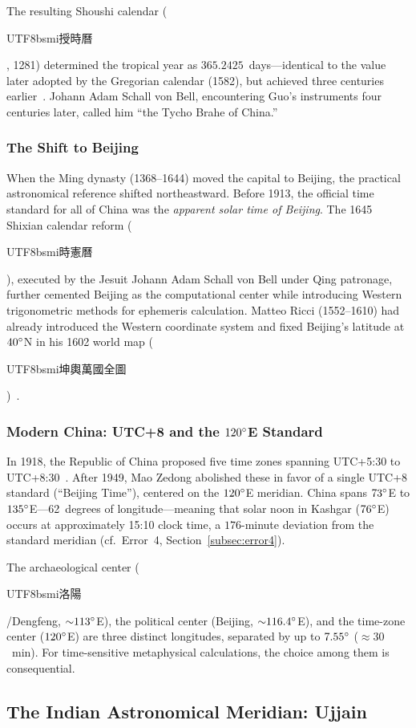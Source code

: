 \documentclass[10pt,a4paper]{article}
\newcommand{\zh}[1]{\begin{CJK}{UTF8}{bsmi}#1\end{CJK}}
\begin{document}
The resulting Shoushi calendar (\zh{授時曆}, 1281) determined the tropical
year as $365.2425$~days---identical to the value later adopted by the
Gregorian calendar (1582), but achieved three centuries
earlier~\cite{sivin2009}. Johann Adam Schall von Bell, encountering Guo's
instruments four centuries later, called him ``the Tycho Brahe of China.''

\subsubsection{The Shift to Beijing}

When the Ming dynasty (1368--1644) moved the capital to Beijing, the
practical astronomical reference shifted northeastward. Before 1913,
the official time standard for all of China was the \emph{apparent solar
time of Beijing}. The 1645 Shixian calendar reform (\zh{時憲曆}),
executed by the Jesuit Johann Adam Schall von Bell under Qing patronage,
further cemented Beijing as the computational center while introducing
Western trigonometric methods for ephemeris calculation. Matteo Ricci
(1552--1610) had already introduced the Western coordinate system and
fixed Beijing's latitude at $40\degree$N in his 1602 world map
(\zh{坤輿萬國全圖})~\cite{udias1994}.

\subsubsection{Modern China: UTC+8 and the $120\degree$E Standard}

In 1918, the Republic of China proposed five time zones spanning
UTC+5:30 to UTC+8:30~\cite{china_timezones_1918}. After 1949, Mao Zedong
abolished these in favor of a single UTC+8 standard (``Beijing
Time''), centered on the $120\degree$E meridian. China spans $73\degree$E to $135\degree$E---62~degrees of
longitude---meaning that solar noon in Kashgar ($76\degree$E) occurs at
approximately 15:10 clock time, a $176$-minute deviation from the standard
meridian (cf.~Error~4, Section~\ref{subsec:error4}).

The archaeological center (\zh{洛陽}/Dengfeng, ${\sim}113\degree$E), the
political center (Beijing, ${\sim}116.4\degree$E), and the time-zone center
($120\degree$E) are three distinct longitudes, separated by up to $7.55\degree$
($\approx 30$~min). For time-sensitive metaphysical calculations, the choice
among them is consequential.

\subsection{The Indian Astronomical Meridian: Ujjain}
\label{subsec:ujjain}
\end{document}
